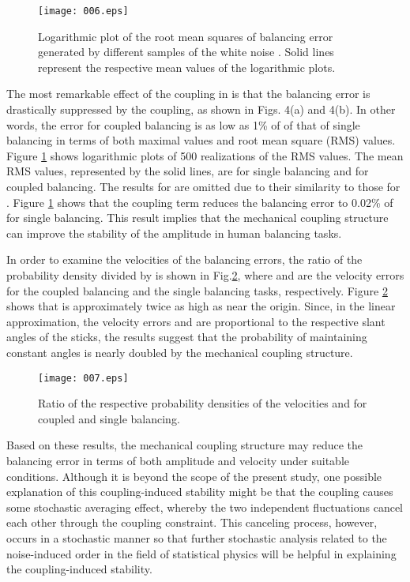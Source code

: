 \documentclass[12pt,a4paper]{ijicic}
\def\lfig#1{\label{fig:#1}}\def\rfig#1{Fig.\ref{fig:#1}}
\def\Rfig#1{Figure \ref{fig:#1}}
\begin{document}
\begin{figure}[t]
 \centering\par \texttt{[image: 006.eps]}
\caption{Logarithmic plot of the root mean squares of balancing error
 generated by different samples of the white noise . Solid
 lines represent the respective mean values of the logarithmic plots.}
\lfig{rms}
\end{figure}

The most remarkable effect of the coupling in  is that
the balancing error is drastically suppressed by the coupling, as shown
in Figs. 4(a) and 4(b). In other words, the error  for coupled
balancing is as low as 1\% of  of that of single balancing in terms
of both maximal values and root mean square (RMS) values.  \Rfig{rms}
shows logarithmic plots of 500 realizations of the RMS values. The mean
RMS values, represented by the solid lines, are  for
single balancing and  for coupled balancing.  The
results for  are omitted due to their similarity to those for
.  \Rfig{rms} shows that the coupling term reduces the balancing
error  to 0.02\% of  for single balancing.  This result
implies that the mechanical coupling structure can improve the stability
of the amplitude in human balancing tasks.

In order to examine the velocities of the balancing errors, the ratio of
the probability density  divided by  is shown in
\rfig{velo}, where  and  are the velocity errors for the
coupled balancing and the single balancing tasks,
respectively. \Rfig{velo} shows that  is approximately twice
as high as  near the origin. Since, in the linear
approximation, the velocity errors  and  are proportional
to the respective slant angles of the sticks, the results suggest that
the probability of maintaining constant angles is nearly doubled by the
mechanical coupling structure.

\begin{figure}[t]
 \centering\par
 \texttt{[image: 007.eps]}
\caption{Ratio of the respective probability densities of the
 velocities  and  for coupled and single
 balancing.}  \lfig{velo}
\end{figure}

Based on these results, the mechanical coupling structure may reduce the
balancing error in terms of both amplitude and velocity under suitable
conditions.
 Although it is beyond the scope of the present study, one possible
 explanation of this coupling-induced stability might be that the
 coupling causes some stochastic averaging effect, whereby the two
 independent fluctuations   cancel each other through
 the coupling constraint. This canceling process, however, occurs in a
 stochastic manner so that further stochastic analysis related to the
 noise-induced order \cite{NIO} in the field of statistical physics will
 be helpful in explaining the coupling-induced stability.
\end{document}
